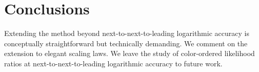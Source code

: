 \section{Conclusions}\label{sec:conclusions}

Extending the method beyond next-to-next-to-leading logarithmic accuracy
is conceptually straightforward but technically demanding. We comment on
the extension to elegant scaling laws. We leave the study of
color-ordered likelihood ratios at next-to-next-to-leading logarithmic
accuracy to future work.

